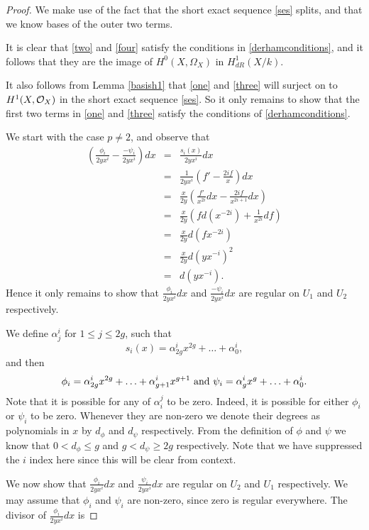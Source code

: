 \documentclass[draft, 11pt]{article} %
\theoremstyle{plain}
\theoremstyle{remark}
\newcommand{\cO}{{\cal O}}
\begin{document}
\begin{proof}
We make use of the fact that the short exact sequence \eqref{ses} splits, and that we know bases of the outer two terms.

It is clear that \eqref{two} and \eqref{four} satisfy the conditions in \eqref{derhamconditions}, and it follows \cite[Thm 6.1]{faithfulaction} that they are the image of $H^0(X,\Omega_X)$ in $H^1_{dR}(X/k)$.

It also follows from Lemma \ref{basish1} that \eqref{one} and \eqref{three} will surject on to $H^1(X,\cO_X)$ in the short exact sequence \eqref{ses}. 
So it only remains to show that the first two terms in \eqref{one} and \eqref{three} satisfy the conditions of \eqref{derhamconditions}.


We start with the case $p\neq 2$, and observe that
\begin{eqnarray*}
\left( \frac{\phi_i}{2yx^i} - \frac{-\psi_i}{2yx^i} \right) dx & = & \frac{s_i(x)}{2yx^i} dx \\
& = & \frac{1}{2yx^i} \left( f' - \frac{2if}{x} \right) dx \\
& = & \frac{x}{2y} \left( \frac{f'}{x^{2i}}dx -\frac{2if}{x^{2i+1}} dx \right) \\
& = & \frac{x}{2y} \left( fd(x^{-2i}) + \frac{1}{x^{2i}}df \right) \\
& = & \frac{x}{2y}d(fx^{-2i}) \\
& = & \frac{x}{2y} d(yx^{-i})^2 \\
& = & d(yx^{-i}).
\end{eqnarray*}
Hence it only remains to show that $\frac{\phi_i}{2yx^i}dx$ and $\frac{-\psi_i}{2yx^i}dx$ are regular on $U_1$ and $U_2$ respectively.



We define $\alpha^i_j$ for $1\leq j \leq 2g$, such that
\[
s_i(x) = \alpha^i_{2g}x^{2g} + \ldots + \alpha^i_0,
\]
and then
\[
\phi_i = \alpha^i_{2g}x^{2g} + \ldots + \alpha^i_{g+1}x^{g+1} \ {\rm and } \ \psi_i = \alpha^i_gx^g + \ldots + \alpha^i_0.
\]
Note that it is possible for any of $\alpha_i^j$ to be zero. Indeed, it is possible for either $\phi_i$ or $\psi_i$ to be zero.
Whenever they are non-zero we denote their degrees as polynomials in $x$ by $d_\phi$ and $d_\psi$ respectively. From the definition of $\phi$ and $\psi$ we know that $0 < d_\phi \leq g$ and $g < d_\psi \geq 2g$ respectively.
Note that we have suppressed the $i$ index here since this will be clear from context.


We now show that $\frac{\phi_i}{2yx^i}dx$ and $\frac{\psi_i}{2yx^i}dx$ are regular on $U_2$ and $U_1$ respectively.
We may assume that $\phi_i$ and $\psi_i$ are non-zero, since zero is regular everywhere.
The divisor of $\frac{\phi_i}{2yx^i}dx$ is


\end{proof}
\end{document}
